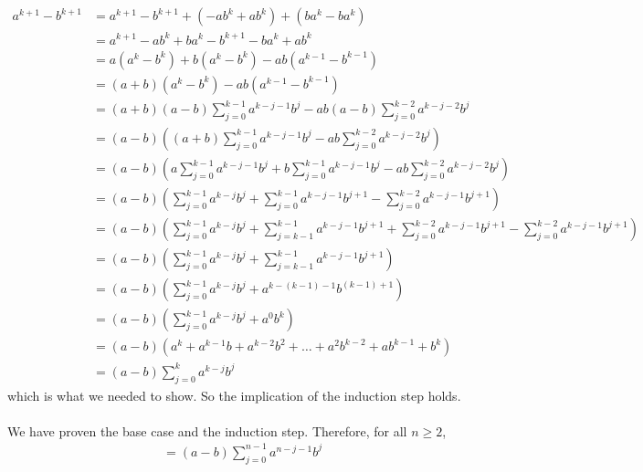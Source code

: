 \documentclass{article}
\begin{document}
	\begin{align*}
		a^{k+1} - b^{k+1} &= a^{k+1} - b^{k+1} + (-ab^k + ab^k) + (ba^k - ba^k) \tag{Adding 0} \\
		                  &= a^{k+1} - ab^k + ba^k - b^{k+1} - ba^k + ab^k \tag{Rearrange terms} \\
		                  &= a(a^k - b^k) + b(a^k - b^k) - ab(a^{k-1} - b^{k-1}) \tag{Factor} \\
		                  &= (a + b)(a^k - b^k) - ab(a^{k-1} - b^{k-1}) \tag{Factor} \\
		                  &= (a + b)(a-b)\sum_{j=0}^{k-1}{a^{k-j-1}b^j} - ab(a-b)\sum_{j=0}^{k-2}{a^{k-j-2}b^j} \tag{Induction Hyp.} \\
		                  &= (a-b)\left((a + b)\sum_{j=0}^{k-1}{a^{k-j-1}b^j} - ab\sum_{j=0}^{k-2}{a^{k-j-2}b^j}\right) \tag{Factor out a - b} \\
		                  &= (a-b)\left(a\sum_{j=0}^{k-1}{a^{k-j-1}b^j} + b\sum_{j=0}^{k-1}{a^{k-j-1}b^j} - ab\sum_{j=0}^{k-2}{a^{k-j-2}b^j}\right) \tag{Distribute left sum} \\
		                  &= (a-b)\left(\sum_{j=0}^{k-1}{a^{k-j}b^j} + \sum_{j=0}^{k-1}{a^{k-j-1}b^{j+1}} - \sum_{j=0}^{k-2}{a^{k-j-1}b^{j+1}}\right) \tag{Multiply into sums} \\
		                  &= (a-b)\left(\sum_{j=0}^{k-1}{a^{k-j}b^j} +
		                   \sum_{j=k-1}^{k-1}{a^{k-j-1}b^{j+1}} +
		                   \sum_{j=0}^{k-2}{a^{k-j-1}b^{j+1}} - \sum_{j=0}^{k-2}{a^{k-j-1}b^{j+1}}\right) \tag{Expand middle sum} \\
		                  &= (a-b)\left(\sum_{j=0}^{k-1}{a^{k-j}b^j} +
		                  \sum_{j=k-1}^{k-1}{a^{k-j-1}b^{j+1}}\right) \tag{Right sums cancel} \\
		                  &= (a-b)\left(\sum_{j=0}^{k-1}{a^{k-j}b^j} + a^{k-(k-1)-1}b^{(k-1)+1}
		                  \right) \tag{Convert to normal notation} \\
		                  &= (a-b)\left(\sum_{j=0}^{k-1}{a^{k-j}b^j} + a^{0}b^{k}
		                  \right) \\
		                  &= (a-b)(a^k + a^{k-1}b + a^{k-2}b^2 + \ldots + a^2b^{k-2} + ab^{k-1} + b^{k}) \tag{Convert to normal notation} \\
		                  &= (a-b)\sum_{j=0}^{k}{a^{k-j}b^{j}} \tag{Convert to sigma notation}
	\end{align*}
	which is what we needed to show. So the implication of the induction step holds. \\\\
	We have proven the base case and the induction step. Therefore, for all $n \geq 2$,
		\begin{align*}
			&= (a - b)\sum_{j=0}^{n-1}{a^{n-j-1}b^j}
		\end{align*}
\end{document}

